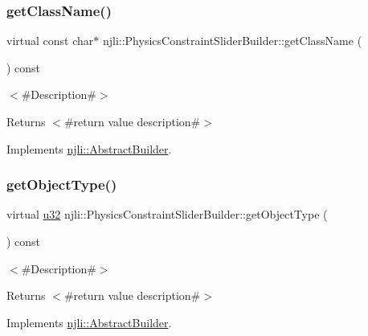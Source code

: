 \subsubsection{\texorpdfstring{get\+Class\+Name()}{getClassName()}}
{\footnotesize\ttfamily virtual const char$\ast$ njli\+::\+Physics\+Constraint\+Slider\+Builder\+::get\+Class\+Name (\begin{DoxyParamCaption}{ }\end{DoxyParamCaption}) const\hspace{0.3cm}{\ttfamily [virtual]}}

$<$\#\+Description\#$>$

\begin{DoxyReturn}{Returns}
$<$\#return value description\#$>$ 
\end{DoxyReturn}


Implements \mbox{\hyperlink{classnjli_1_1_abstract_builder_a902f73ea78031b06aca183a417f3413b}{njli\+::\+Abstract\+Builder}}.

\mbox{\label{classnjli_1_1_physics_constraint_slider_builder_a185c67ee17f1c3ee041755d91709a08c}} 
\subsubsection{\texorpdfstring{get\+Object\+Type()}{getObjectType()}}
{\footnotesize\ttfamily virtual \mbox{\hyperlink{_util_8h_a10e94b422ef0c20dcdec20d31a1f5049}{u32}} njli\+::\+Physics\+Constraint\+Slider\+Builder\+::get\+Object\+Type (\begin{DoxyParamCaption}{ }\end{DoxyParamCaption}) const\hspace{0.3cm}{\ttfamily [virtual]}}

$<$\#\+Description\#$>$

\begin{DoxyReturn}{Returns}
$<$\#return value description\#$>$ 
\end{DoxyReturn}


Implements \mbox{\hyperlink{classnjli_1_1_abstract_builder_a0f2d344fcf697b167f4f2b1122b5fb33}{njli\+::\+Abstract\+Builder}}.

\mbox{\label{classnjli_1_1_physics_constraint_slider_builder_a940b9375eeda3834193940f434581374}} 
